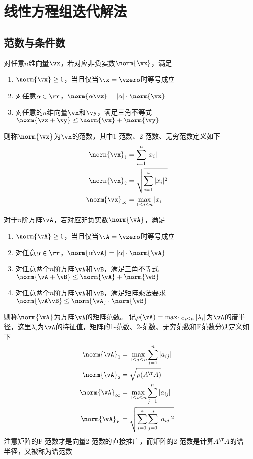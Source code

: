 
\section{线性方程组迭代解法}
\subsection{范数与条件数}
\begin{definition}[向量的范数]
    对任意$n$维向量$\vx$，若对应非负实数$\norm{\vx}$，满足
    \begin{enumerate}
        \item $\norm{\vx}\geq 0$，当且仅当$\vx=\vzero$时等号成立
        \item 对任意$\alpha\in\rr$，$\norm{\alpha\vx}=|\alpha|\cdot\norm{\vx}$
        \item 对任意的$n$维向量$\vx$和$\vy$，满足三角不等式$\norm{\vx+\vy}\leq\norm{\vx}+\norm{\vy}$
    \end{enumerate}
    则称$\norm{\vx}$为$\vx$的范数，其中1-范数、2-范数、无穷范数定义如下
    \[\begin{aligned}
        \norm{\vx}_1&=\sum_{i=1}^n|x_i|\\
        \norm{\vx}_2&=\sqrt{\sum_{i=1}^n|x_i|^2}\\
        \norm{\vx}_\infty&=\max_{1\leq i\leq n}|x_i|
    \end{aligned}\]
\end{definition}
\begin{definition}[矩阵的范数]
    对于$n$阶方阵$\vA$，若对应非负实数$\norm{\vA}$，满足
    \begin{enumerate}
        \item $\norm{\vA}\geq 0$，当且仅当$\vA=\vzero$时等号成立
        \item 对任意$\alpha\in\rr$，$\norm{\alpha\vA}=|\alpha|\cdot\norm{\vA}$
        \item 对任意两个$n$阶方阵$\vA$和$\vB$，满足三角不等式$\norm{\vA+\vB}\leq\norm{\vA}+\norm{\vB}$
        \item 对任意两个$n$阶方阵$\vA$和$\vB$，满足矩阵乘法要求$\norm{\vA\vB}\leq\norm{\vA}\cdot\norm{\vB}$
    \end{enumerate}
    则称$\norm{\vA}$为方阵$\vA$的矩阵范数。
    记$\rho(\vA)=\max_{1\leq i\leq n}|\lambda_i|$为$\vA$的谱半径，这里$\lambda_i$为$\vA$的特征值，矩阵的1-范数、2-范数、无穷范数和F范数分别定义如下
    \[\begin{aligned}
        \norm{\vA}_1&=\max_{1\leq j\leq n}\sum_{i=1}^n|a_{ij}|\\
        \norm{\vA}_2&=\sqrt{\rho(A^\T A)}\\
        \norm{\vA}_\infty&=\max_{1\leq i\leq n}\sum_{j=1}^n|a_{ij}|\\
        \norm{\vA}_F&=\sqrt{\sum_{i=1}^n\sum_{j=1}^n|a_{ij}|^2}
    \end{aligned}\]
    注意矩阵的F-范数才是向量2-范数的直接推广，而矩阵的2-范数是计算$A^\T A$的谱半径，又被称为谱范数
\end{definition}
